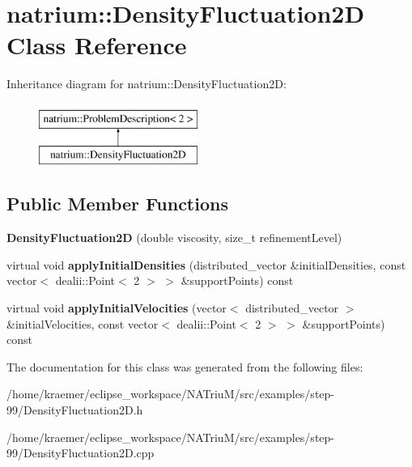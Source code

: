 \hypertarget{classnatrium_1_1DensityFluctuation2D}{\section{natrium\-:\-:Density\-Fluctuation2\-D Class Reference}
\label{classnatrium_1_1DensityFluctuation2D}
}
Inheritance diagram for natrium\-:\-:Density\-Fluctuation2\-D\-:\begin{figure}[H]
\begin{center}
\leavevmode
\includegraphics[height=2.000000cm]{classnatrium_1_1DensityFluctuation2D}
\end{center}
\end{figure}
\subsection*{Public Member Functions}
\begin{DoxyCompactItemize}
\item 
\hypertarget{classnatrium_1_1DensityFluctuation2D_aac8ea303ea740e73868cd1ee431e182f}{{\bfseries Density\-Fluctuation2\-D} (double viscosity, size\-\_\-t refinement\-Level)}\label{classnatrium_1_1DensityFluctuation2D_aac8ea303ea740e73868cd1ee431e182f}

\item 
\hypertarget{classnatrium_1_1DensityFluctuation2D_a7d345499b56b65e0b107defcd5c89e2e}{virtual void {\bfseries apply\-Initial\-Densities} (distributed\-\_\-vector \&initial\-Densities, const vector$<$ dealii\-::\-Point$<$ 2 $>$ $>$ \&support\-Points) const }\label{classnatrium_1_1DensityFluctuation2D_a7d345499b56b65e0b107defcd5c89e2e}

\item 
\hypertarget{classnatrium_1_1DensityFluctuation2D_a217a8d3635da81fb0350671a86142b57}{virtual void {\bfseries apply\-Initial\-Velocities} (vector$<$ distributed\-\_\-vector $>$ \&initial\-Velocities, const vector$<$ dealii\-::\-Point$<$ 2 $>$ $>$ \&support\-Points) const }\label{classnatrium_1_1DensityFluctuation2D_a217a8d3635da81fb0350671a86142b57}

\end{DoxyCompactItemize}


The documentation for this class was generated from the following files\-:\begin{DoxyCompactItemize}
\item 
/home/kraemer/eclipse\-\_\-workspace/\-N\-A\-Triu\-M/src/examples/step-\/99/Density\-Fluctuation2\-D.\-h\item 
/home/kraemer/eclipse\-\_\-workspace/\-N\-A\-Triu\-M/src/examples/step-\/99/Density\-Fluctuation2\-D.\-cpp\end{DoxyCompactItemize}
